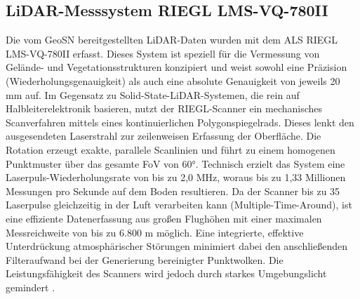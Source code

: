 \subsection{LiDAR-Messsystem RIEGL LMS-VQ-780II}

Die vom GeoSN bereitgestellten LiDAR-Daten wurden mit dem ALS RIEGL LMS-VQ-780II erfasst. Dieses System ist speziell für die Vermessung von Gelände- und Vegetationsstrukturen konzipiert und weist sowohl eine Präzision (Wiederholungsgenauigkeit) als auch eine absolute Genauigkeit von jeweils 20 mm auf. Im Gegensatz zu Solid-State-LiDAR-Systemen, die rein auf Halbleiterelektronik basieren, nutzt der RIEGL-Scanner ein mechanisches Scanverfahren mittels eines kontinuierlichen Polygonspiegelrads. Dieses lenkt den ausgesendeten Laserstrahl zur zeilenweisen Erfassung der Oberfläche. Die Rotation erzeugt exakte, parallele Scanlinien und führt zu einem homogenen Punktmuster über das gesamte FoV von 60°. Technisch erzielt das System eine Laserpuls-Wiederholungsrate von bis zu 2,0 MHz, woraus bis zu 1,33 Millionen Messungen pro Sekunde auf dem Boden resultieren. Da der Scanner bis zu 35 Laserpulse gleichzeitig in der Luft verarbeiten kann (Multiple-Time-Around), ist eine effiziente Datenerfassung aus großen Flughöhen mit einer maximalen Messreichweite von bis zu 6.800 m möglich. Eine integrierte, effektive Unterdrückung atmosphärischer Störungen minimiert dabei den anschließenden Filteraufwand bei der Generierung bereinigter Punktwolken. Die Leistungsfähigkeit des Scanners wird jedoch durch starkes Umgebungslicht gemindert \cite{zotero-item-48}.